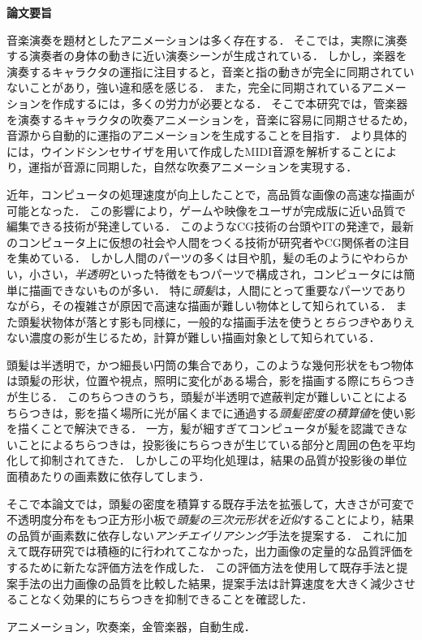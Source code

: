 \begin{center}
{\bf {\large 論文要旨}}
\end{center}

\vspace{3ex}
音楽演奏を題材としたアニメーションは多く存在する．
そこでは，実際に演奏する演奏者の身体の動きに近い演奏シーンが生成されている．
しかし，楽器を演奏するキャラクタの運指に注目すると，音楽と指の動きが完全に同期されていないことがあり，強い違和感を感じる．
また，完全に同期されているアニメーションを作成するには，多くの労力が必要となる．
そこで本研究では，管楽器を演奏するキャラクタの吹奏アニメーションを，音楽に容易に同期させるため，音源から自動的に運指のアニメーションを生成することを目指す．
より具体的には，ウインドシンセサイザを用いて作成したMIDI音源を解析することにより，運指が音源に同期した，自然な吹奏アニメーションを実現する．

近年，コンピュータの処理速度が向上したことで，高品質な画像の高速な描画が可能となった．
%
この影響により，ゲームや映像をユーザが完成版に近い品質で編集できる技術が発達している．
%
このようなCG技術の台頭やITの発達で，最新のコンピュータ上に仮想の社会や人間をつくる技術が研究者やCG関係者の注目を集めている．
%
しかし人間のパーツの多くは目や肌，髪の毛のようにやわらかい，小さい，\emph{半透明}といった特徴をもつパーツで構成され，コンピュータには簡単に描画できないものが多い．
%
特に\emph{頭髪}は，人間にとって重要なパーツでありながら，その複雑さが原因で高速な描画が難しい物体として知られている．
%
また頭髪状物体が落とす影も同様に，一般的な描画手法を使うと\emph{ちらつき}やありえない濃度の影が生じるため，計算が難しい描画対象として知られている．\par

頭髪は半透明で，かつ細長い円筒の集合であり，このような幾何形状をもつ物体は頭髪の形状，位置や視点，照明に変化がある場合，影を描画する際にちらつきが生じる．
%
このちらつきのうち，頭髪が半透明で遮蔽判定が難しいことによるちらつきは，影を描く場所に光が届くまでに通過する\emph{頭髪密度の積算値}を使い影を描くことで解決できる．
%
一方，髪が細すぎてコンピュータが髪を認識できないことによるちらつきは，投影後にちらつきが生じている部分と周囲の色を平均化して抑制されてきた．
%
しかしこの平均化処理は，結果の品質が投影後の単位面積あたりの画素数に依存してしまう．\par
そこで本論文では，頭髪の密度を積算する既存手法を拡張して，大きさが可変で不透明度分布をもつ正方形小板で\emph{頭髪の三次元形状を近似}することにより，結果の品質が画素数に依存しない\emph{アンチエイリアシング}手法を提案する．
%
これに加えて既存研究では積極的に行われてこなかった，出力画像の定量的な品質評価をするために新たな評価方法を作成した．
%
この評価方法を使用して既存手法と提案手法の出力画像の品質を比較した結果，提案手法は計算速度を大きく減少させることなく効果的にちらつきを抑制できることを確認した．

\vspace{4ex}

\noindent
{}

\noindent
アニメーション，吹奏楽，金管楽器，自動生成．